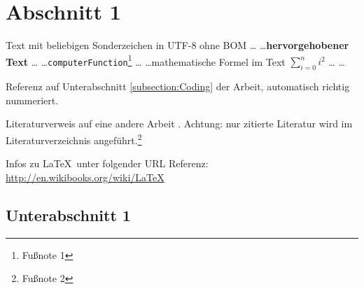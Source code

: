 \section{Abschnitt 1}
\label{section:Introduction}

Text mit beliebigen Sonderzeichen in UTF-8 ohne BOM \ldots
\ldots \textbf{hervorgehobener Text} \ldots
\ldots \texttt{computerFunction}\footnote{
	Fußnote 1
}
\ldots
\ldots mathematische Formel im Text $\sum_{i=0}^n i^2$
\ldots
\ldots

Referenz auf Unterabschnitt \ref{subsection:Coding} der Arbeit, automatisch
richtig nummeriert.

Literaturverweis auf eine andere Arbeit \cite[]{McConnell:2004:CCS:1096143}.
Achtung: nur zitierte Literatur wird im Literaturverzeichnis
angeführt.\footnote{
	Fußnote 2
}

Infos zu \LaTeX\ unter folgender URL Referenz:
\url{http://en.wikibooks.org/wiki/LaTeX}


\subsection{Unterabschnitt 1}

